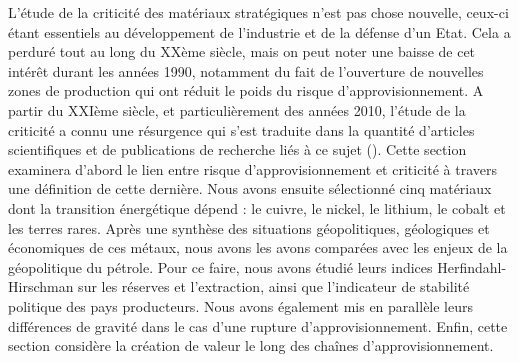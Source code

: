 L'étude de la criticité des matériaux stratégiques n'est pas chose nouvelle, ceux-ci étant essentiels au développement de l'industrie et de la défense d'un Etat. Cela a perduré tout au long du XXème siècle, mais on peut noter une baisse de cet intérêt durant les années 1990, notamment du fait de l'ouverture de nouvelles zones de production qui ont réduit le poids du risque d'approvisionnement. A partir du XXIème siècle, et particulièrement des années 2010, l'étude de la criticité a connu une résurgence qui s'est traduite dans la quantité d'articles scientifiques et de publications de recherche liés à ce sujet (\cite{hache_vers_2019}). 
\smallbreak
Cette section examinera d'abord le lien entre risque d'approvisionnement et criticité à travers une définition de cette dernière. Nous avons ensuite sélectionné cinq matériaux dont la transition énergétique dépend : le cuivre, le nickel, le lithium, le cobalt et les terres rares. Après une synthèse des situations géopolitiques, géologiques et économiques de ces métaux, nous avons les avons comparées avec les enjeux de la géopolitique du pétrole. Pour ce faire, nous avons étudié leurs indices Herfindahl-Hirschman sur les réserves et l'extraction, ainsi que l'indicateur de stabilité politique des pays producteurs. Nous avons également mis en parallèle leurs différences de gravité dans le cas d'une rupture d'approvisionnement. Enfin, cette section considère la création de valeur le long des chaînes d'approvisionnement.